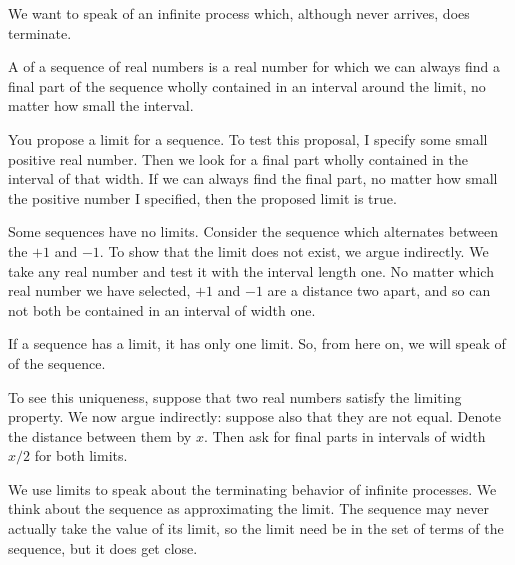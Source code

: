 \sbasic



\sstart



We want to speak of an
infinite process which,
although never arrives,
does terminate.


A
of a sequence of real
numbers is a real number
for which we can always
find a final part of the
sequence wholly contained
in an interval around the limit,
no matter how small the interval.

You propose a limit
for a sequence.
To test this proposal,
I specify some small
positive real number.
Then we look for a
final part wholly contained
in the interval of that
width.
If we can always find the
final part, no matter
how small the positive
number I specified,
then the proposed limit
is true.


Some sequences have no
limits.
Consider the sequence
which alternates between
the $+1$
and $-1$.
To show that the limit
does not exist, we
argue indirectly.
We take any real
number and test it
with the interval length
one.
No matter which
real number we have
selected,
$+1$ and
$-1$ are a
distance two apart,
and so can not
both be contained
in an interval
of width one.



If a sequence has a limit,
it has only one limit.
So, from here on, we will speak
of  of
the sequence.

To see this uniqueness,
suppose that two
real numbers satisfy the
limiting property.
We now argue indirectly:
suppose also that they are
not equal.
Denote the distance between
them by $x$.
Then ask for final parts
in intervals of width $x/2$
for both limits.


We use limits to speak about
the terminating behavior of
infinite processes.
We think about the sequence
as approximating the limit.
The sequence may never
actually take the value
of its limit, so the
limit need be in the
set of terms of the sequence,
but it does get close.

